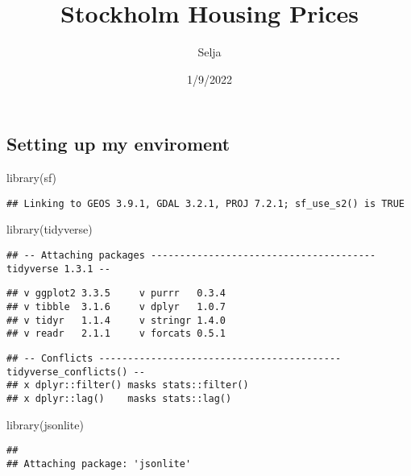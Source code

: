 \documentclass[
]{article}
\title{Stockholm Housing Prices}
\author{Selja}
\date{1/9/2022}
\newenvironment{Shaded}{\begin{snugshade}}{\end{snugshade}}
\newcommand{\FunctionTok}[1]{\textcolor[rgb]{0.00,0.00,0.00}{#1}}
\newcommand{\NormalTok}[1]{#1}
\begin{document}
\maketitle

\hypertarget{setting-up-my-enviroment}{%
\subsection{Setting up my enviroment}\label{setting-up-my-enviroment}}

\begin{Shaded}
\begin{Highlighting}[]
\FunctionTok{library}\NormalTok{(sf)}
\end{Highlighting}
\end{Shaded}

\begin{verbatim}
## Linking to GEOS 3.9.1, GDAL 3.2.1, PROJ 7.2.1; sf_use_s2() is TRUE
\end{verbatim}

\begin{Shaded}
\begin{Highlighting}[]
\FunctionTok{library}\NormalTok{(tidyverse)}
\end{Highlighting}
\end{Shaded}

\begin{verbatim}
## -- Attaching packages --------------------------------------- tidyverse 1.3.1 --
\end{verbatim}

\begin{verbatim}
## v ggplot2 3.3.5     v purrr   0.3.4
## v tibble  3.1.6     v dplyr   1.0.7
## v tidyr   1.1.4     v stringr 1.4.0
## v readr   2.1.1     v forcats 0.5.1
\end{verbatim}

\begin{verbatim}
## -- Conflicts ------------------------------------------ tidyverse_conflicts() --
## x dplyr::filter() masks stats::filter()
## x dplyr::lag()    masks stats::lag()
\end{verbatim}

\begin{Shaded}
\begin{Highlighting}[]
\FunctionTok{library}\NormalTok{(jsonlite)}
\end{Highlighting}
\end{Shaded}

\begin{verbatim}
## 
## Attaching package: 'jsonlite'
\end{verbatim}
\end{document}
